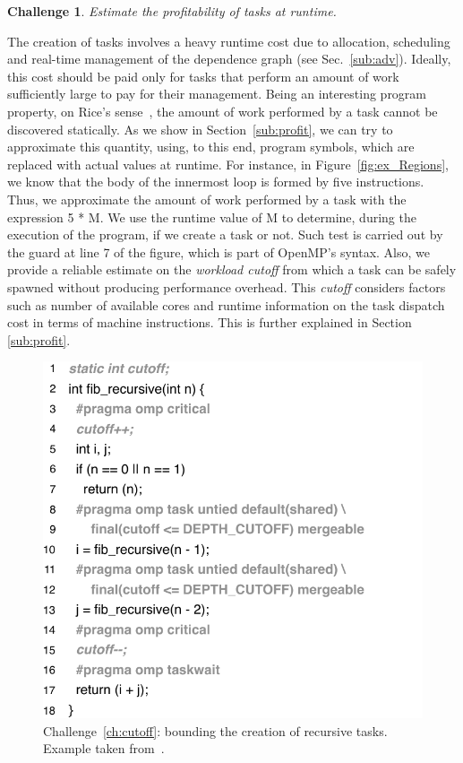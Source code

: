 \documentclass[sigplan,10pt,screen]{acmart}
\newtheorem{Challenge}{Challenge}[section]
\begin{document}
\begin{Challenge}
\label{ch:cost}
Estimate the profitability of tasks at runtime.
\end{Challenge}

The creation of tasks involves a heavy runtime cost due to allocation,
scheduling and real-time management of the dependence graph
(see Sec.~\ref{sub:adv}).
Ideally, this cost should be paid only for tasks that perform an amount of work
sufficiently large to pay for their management.
Being an interesting program property, on Rice's sense~\cite{Rice53}, the amount
of work performed by a task cannot be discovered statically.
As we show in Section~\ref{sub:profit}, we can try to approximate this quantity, using,
to this end, program symbols, which are replaced with actual values at runtime.
For instance, in Figure~\ref{fig:ex_Regions}, we know that the body of the
innermost loop is formed by five instructions.
Thus, we approximate the amount of work performed by a task with the
expression \textsf{5 * M}.
We use the runtime value of \textsf{M} to determine, during the execution of the
program, if we create a task or not.
Such test is carried out by the guard at line 7 of the figure, which is part of
OpenMP's syntax. Also, we provide a reliable estimate on the \emph{workload cutoff}
from which a task can be safely spawned without producing performance overhead.
This \emph{cutoff} considers factors such as number of available cores
and runtime information on the task dispatch cost in terms of machine
instructions. This is further explained in Section \ref{sub:profit}.

\begin{figure}[h!]
\begin{center}
\includegraphics[width=1\columnwidth]{images/ex_cutoff}
\caption{Challenge~\ref{ch:cutoff}: bounding the creation of recursive tasks.
Example taken from~\cite[Fig.1]{Iwasaki16}.}
\label{fig:ex_cutoff}
\end{center}
\end{figure}
\end{document}
